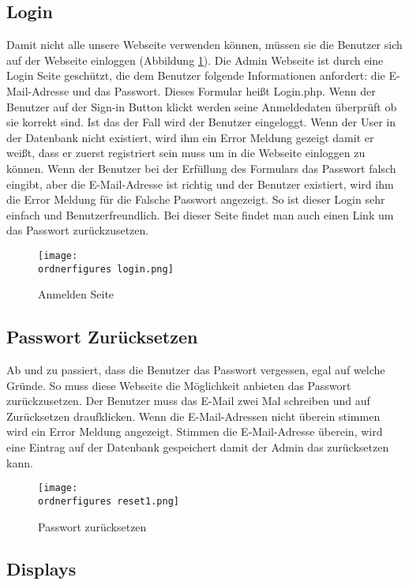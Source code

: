 \subsection{Login}
Damit nicht alle unsere Webseite verwenden können, müssen sie die Benutzer sich auf der Webseite einloggen (Abbildung \ref{fi:login}). Die Admin Webseite ist durch eine Login Seite geschützt, die dem Benutzer folgende Informationen anfordert: die E-Mail-Adresse und das Passwort. Dieses Formular heißt Login.php. Wenn der Benutzer auf der Sign-in Button klickt werden seine Anmeldedaten überprüft ob sie korrekt sind. Ist das der Fall wird der Benutzer eingeloggt. Wenn der User in der Datenbank nicht existiert, wird ihm ein Error Meldung gezeigt damit er weißt, dass er zuerst registriert sein muss um in die Webseite einloggen zu können. Wenn der Benutzer bei der Erfüllung des Formulars das Passwort falsch eingibt, aber die E-Mail-Adresse ist richtig und der Benutzer existiert, wird ihm die Error Meldung für die Falsche Passwort angezeigt. So ist dieser Login sehr einfach und Benutzerfreundlich. Bei dieser Seite findet man auch einen Link um das Passwort zurückzusetzen.

\begin{figure}[H]
	\centering
	\texttt{[image: \\ordnerfigures login.png]}
	\caption{Anmelden Seite}
	\label{fi:login}
\end{figure}

\subsection{Passwort Zurücksetzen}
Ab und zu passiert, dass die Benutzer das Passwort vergessen, egal auf welche Gründe. So muss diese Webseite die Möglichkeit anbieten das Passwort zurückzusetzen. Der Benutzer muss das E-Mail zwei Mal schreiben und auf Zurücksetzen draufklicken. Wenn die E-Mail-Adressen nicht überein stimmen wird ein Error Meldung angezeigt. Stimmen die E-Mail-Adresse überein, wird eine Eintrag auf der Datenbank gespeichert damit der Admin das zurücksetzen kann.
\begin{figure}[H]
	\centering
	\texttt{[image: \\ordnerfigures reset1.png]}
	\caption{Passwort zurücksetzen}
	\label{fi:reset}
\end{figure}

\subsection{Displays}



